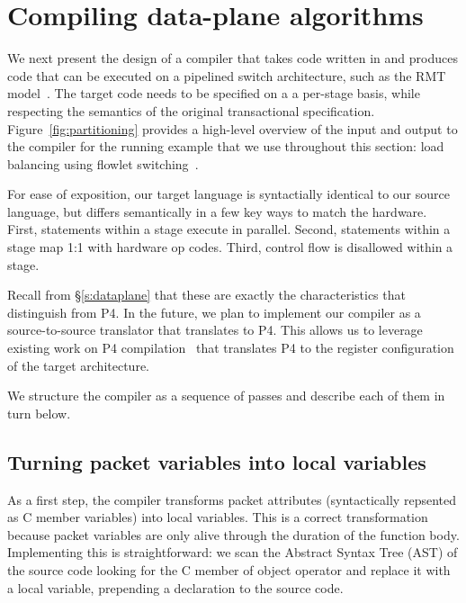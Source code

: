 \section{Compiling data-plane algorithms}
\label{s:compiler}

We next present the design of a compiler that takes code written in \language{}
and produces code that can be executed on a pipelined switch architecture, such
as the RMT model~\cite{rmt}. The target code needs to be specified on a a
per-stage basis, while respecting the semantics of the original transactional
specification.  Figure~\ref{fig:partitioning} provides a high-level overview of
the input and output to the compiler for the running example that we use
throughout this section: load balancing using flowlet
switching~\cite{dina_flowlets}.

For ease of exposition, our target language is syntactially identical to our
source language, but differs semantically in a few key ways to match the
hardware. First, statements within a stage execute in parallel. Second,
statements within a stage map 1:1 with hardware op codes. Third, control flow
is disallowed within a stage.

Recall from \S\ref{s:dataplane} that these are exactly the characteristics that
distinguish \language{} from P4. In the future, we plan to implement our
compiler as a source-to-source translator that translates \language{} to P4.
This allows us to leverage existing work on P4
compilation~\cite{lavanya_compiler, brebner, netronome} that translates P4 to
the register configuration of the target architecture.

We structure the compiler as a sequence of passes and describe each of them in
turn below. 

\subsection{Turning packet variables into local variables}
As a first step, the compiler transforms packet attributes (syntactically
repsented as C member variables) into local variables.  This is a correct
transformation because packet variables are only alive through the duration of
the function body. Implementing this is straightforward: we scan the Abstract
Syntax Tree (AST) of the source code looking for the C member of object
operator and replace it with a local variable, prepending a declaration to the
source code.

